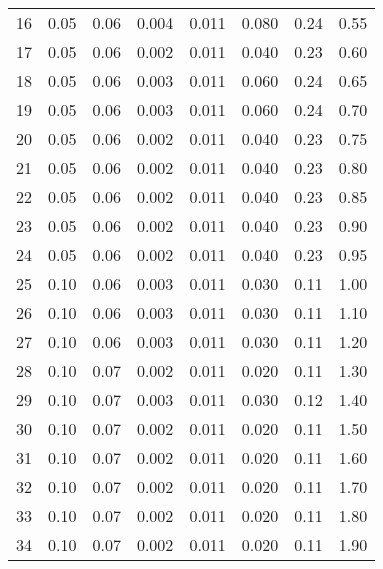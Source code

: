 \begin{center}
\begin{tabular}{gcccc|ccc}
        16 &     0.05 &         0.06 &     0.004 &         0.011 &  0.080 &      0.24 &  0.55 \\      
        17 &     0.05 &         0.06 &     0.002 &         0.011 &  0.040 &      0.23 &  0.60 \\      
        18 &     0.05 &         0.06 &     0.003 &         0.011 &  0.060 &      0.24 &  0.65 \\      
        19 &     0.05 &         0.06 &     0.003 &         0.011 &  0.060 &      0.24 &  0.70 \\      
        20 &     0.05 &         0.06 &     0.002 &         0.011 &  0.040 &      0.23 &  0.75 \\      
        21 &     0.05 &         0.06 &     0.002 &         0.011 &  0.040 &      0.23 &  0.80 \\      
        22 &     0.05 &         0.06 &     0.002 &         0.011 &  0.040 &      0.23 &  0.85 \\      
        23 &     0.05 &         0.06 &     0.002 &         0.011 &  0.040 &      0.23 &  0.90 \\      
        24 &     0.05 &         0.06 &     0.002 &         0.011 &  0.040 &      0.23 &  0.95 \\      
        25 &     0.10 &         0.06 &     0.003 &         0.011 &  0.030 &      0.11 &  1.00 \\      
        26 &     0.10 &         0.06 &     0.003 &         0.011 &  0.030 &      0.11 &  1.10 \\      
        27 &     0.10 &         0.06 &     0.003 &         0.011 &  0.030 &      0.11 &  1.20 \\      
        28 &     0.10 &         0.07 &     0.002 &         0.011 &  0.020 &      0.11 &  1.30 \\      
        29 &     0.10 &         0.07 &     0.003 &         0.011 &  0.030 &      0.12 &  1.40 \\      
        30 &     0.10 &         0.07 &     0.002 &         0.011 &  0.020 &      0.11 &  1.50 \\      
        31 &     0.10 &         0.07 &     0.002 &         0.011 &  0.020 &      0.11 &  1.60 \\      
        32 &     0.10 &         0.07 &     0.002 &         0.011 &  0.020 &      0.11 &  1.70 \\      
        33 &     0.10 &         0.07 &     0.002 &         0.011 &  0.020 &      0.11 &  1.80 \\      
        34 &     0.10 &         0.07 &     0.002 &         0.011 &  0.020 &      0.11 &  1.90 \\      

\end{tabular}
\end{center}
